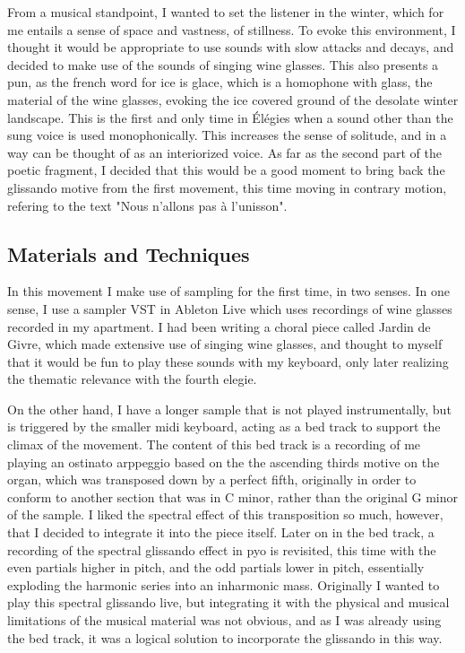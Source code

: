 \documentclass[12pt,twoside,maitrise]{dms_ks}
\theoremstyle{definition}
\begin{document}
From a musical standpoint, I wanted to set the listener in the winter, which for me entails a sense of space and vastness, of stillness.
To evoke this environment, I thought it would be appropriate to use sounds with slow attacks and decays, and decided to make use of the sounds of singing wine glasses.
This also presents a pun, as the french word for ice is glace, which is a homophone with glass, the material of the wine glasses, evoking the ice covered ground of the desolate winter landscape.
This is the first and only time in Élégies when a sound other than the sung voice is used monophonically. This increases the sense of solitude, and in a way can be thought of as an interiorized voice.
As far as the second part of the poetic fragment, I decided that this would be a good moment to bring back the glissando motive from the first movement, this time moving in contrary motion, refering to the text "Nous n'allons pas à l'unisson".

\subsection{Materials and Techniques}

In this movement I make use of sampling for the first time, in two senses.
In one sense, I use a sampler VST in Ableton Live which uses recordings of wine glasses recorded in my apartment.
I had been writing a choral piece called Jardin de Givre, which made extensive use of singing wine glasses, and thought to myself that it would be fun to play these sounds with my keyboard, only later realizing the thematic relevance with the fourth elegie.

On the other hand, I have a longer sample that is not played instrumentally, but is triggered by the smaller midi keyboard, acting as a bed track to support the climax of the movement. The content of this bed track is a recording of me playing an ostinato arppeggio based on the the ascending thirds motive on the organ, which was transposed down by a perfect fifth, originally in order to conform to another section that was in C minor, rather than the original G minor of the sample. I liked the spectral effect of this transposition so much, however, that I decided to integrate it into the piece itself. Later on in the bed track, a recording of the spectral glissando effect in pyo is revisited, this time with the even partials higher in pitch, and the odd partials lower in pitch, essentially exploding the harmonic series into an inharmonic mass. Originally I wanted to play this spectral glissando live, but integrating it with the physical and musical limitations of the musical material was not obvious, and as I was already using the bed track, it was a logical solution to incorporate the glissando in this way.
\end{document}
